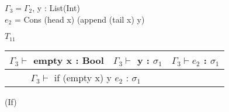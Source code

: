 \documentclass[12pt, a4paper]{article}
\begin{document}
\begin{enumerate}[(a)]
	$\Gamma_3 = \Gamma_2$, y : List(Int)\\
	$e_2$ = Cons (head x) (append (tail x) y)

	$T_{11}$
	\begin{tabular}{c c c}
		$\Gamma_3 \vdash$ empty x : Bool & $\Gamma_3 \vdash$ y : $\sigma_1$ & $\Gamma_3 \vdash e_2$ : $\sigma_1$
		\\\hline
		\multicolumn{2}{c}{$\Gamma_3 \vdash$ if (empty x) y $e_2$ : $\sigma_1$}
	\end{tabular}
	(If)
\end{enumerate}

\section{} %
\end{document}
